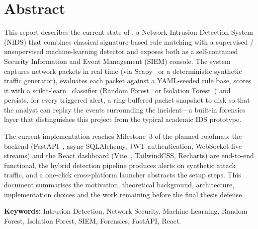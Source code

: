 \section*{Abstract}

This report describes the current state of \nidsname, a Network Intrusion
Detection System (NIDS) that combines classical signature-based rule
matching with a supervised / unsupervised machine-learning detector and
exposes both as a self-contained Security Information and Event Management
(SIEM) console. The system captures network packets in real time
(via Scapy~\cite{scapy} or a deterministic synthetic traffic generator),
evaluates each packet against a YAML-seeded rule base, scores it with a
scikit-learn~\cite{pedregosa2011scikit} classifier (Random
Forest~\cite{breiman2001random} or Isolation Forest~\cite{liu2008isolation})
and persists, for every triggered alert, a ring-buffered packet snapshot to
disk so that the analyst can replay the events surrounding the
incident---a built-in forensics layer that distinguishes this project from
the typical academic IDS prototype.

The current implementation reaches Milestone~3 of the planned roadmap: the
backend (FastAPI~\cite{ramirez2022fastapi}, async SQLAlchemy, JWT
authentication, WebSocket live streams) and the React dashboard
(Vite~\cite{vite}, TailwindCSS, Recharts) are end-to-end functional, the
hybrid detection pipeline produces alerts on synthetic attack traffic, and
a one-click cross-platform launcher abstracts the setup steps. This
document summarises the motivation, theoretical background, architecture,
implementation choices and the work remaining before the final thesis
defense.
\vspace{0.4cm}

\noindent\textbf{Keywords:} Intrusion Detection, Network Security,
Machine Learning, Random Forest, Isolation Forest, SIEM, Forensics,
FastAPI, React.
